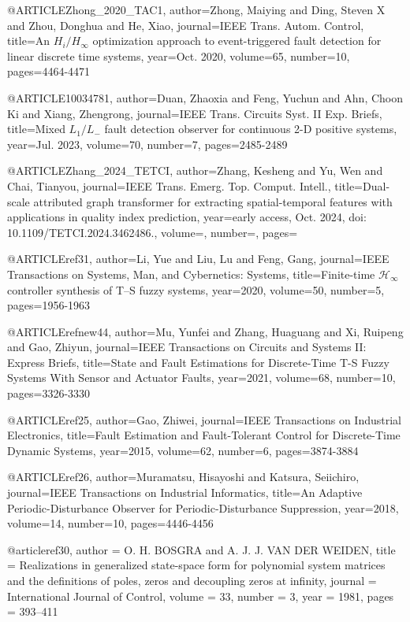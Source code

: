 @ARTICLE{Zhong_2020_TAC1,
  author={Zhong, Maiying and Ding, Steven X and Zhou, Donghua and He, Xiao},
  journal={IEEE Trans. Autom. Control}, 
  title={An ${H}_{i}/{H}_{\infty }$ optimization approach to event-triggered fault detection for linear discrete time systems}, 
  year={Oct. 2020},
  volume={65},
  number={10},
  pages={4464-4471}}

@ARTICLE{10034781,
  author={Duan, Zhaoxia and Feng, Yuchun and Ahn, Choon Ki and Xiang, Zhengrong},
  journal={IEEE Trans. Circuits Syst. II Exp. Briefs}, 
  title={Mixed ${L}_1/{L}_{-}$ fault detection observer for continuous 2-D positive systems}, 
  year={Jul. 2023},
  volume={70},
  number={7},
  pages={2485-2489}}



@ARTICLE{Zhang_2024_TETCI,
  author={Zhang, Kesheng and Yu, Wen and Chai, Tianyou},
  journal={IEEE Trans. Emerg. Top. Comput. Intell.}, 
  title={Dual-scale attributed graph transformer for extracting spatial-temporal features with applications in quality index prediction}, 
  year={early access, Oct. 2024, doi: 10.1109/TETCI.2024.3462486.},
  volume={},
  number={},
  pages={}}

@ARTICLE{ref31,
  author={Li, Yue and Liu, Lu and Feng, Gang},
  journal={IEEE Transactions on Systems, Man, and Cybernetics: Systems}, 
  title={Finite-time  $\mathcal{H}_{\infty}$  controller synthesis of T–S fuzzy systems}, 
  year={2020},
  volume={50},
  number={5},
  pages={1956-1963}}

@ARTICLE{refnew44,
  author={Mu, Yunfei and Zhang, Huaguang and Xi, Ruipeng and Gao, Zhiyun},
  journal={IEEE Transactions on Circuits and Systems II: Express Briefs}, 
  title={State and Fault Estimations for Discrete-Time T-S Fuzzy Systems With Sensor and Actuator Faults}, 
  year={2021},
  volume={68},
  number={10},
  pages={3326-3330}}

@ARTICLE{ref25,
  author={Gao, Zhiwei},
  journal={IEEE Transactions on Industrial Electronics}, 
  title={Fault Estimation and Fault-Tolerant Control for Discrete-Time Dynamic Systems}, 
  year={2015},
  volume={62},
  number={6},
  pages={3874-3884}}

@ARTICLE{ref26,
  author={Muramatsu, Hisayoshi and Katsura, Seiichiro},
  journal={IEEE Transactions on Industrial Informatics}, 
  title={An Adaptive Periodic-Disturbance Observer for Periodic-Disturbance Suppression}, 
  year={2018},
  volume={14},
  number={10},
  pages={4446-4456}}

@article{ref30,
author = {O. H. BOSGRA and A. J. J. VAN DER WEIDEN},
title = {Realizations in generalized state-space form for polynomial system matrices and the definitions of poles, zeros and decoupling zeros at infinity},
journal = {International Journal of Control},
volume = {33},
number = {3},
year = {1981},
pages = {393--411}}
  
